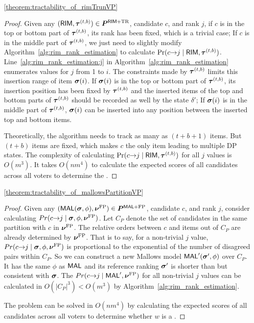 \begin{reptheorem} {\ref{theorem:tractability_of_rimTrunVP}}
  \theoremTractabilityOfRimTrun
\end{reptheorem}

\begin{proof}
    Given any $(\mathsf{RIM}, \bm{\tau}^{(t, b)}) \in \bm{P}^{\mathsf{RIM} \text{+TR}}$, candidate $c$, and rank $j$, if $c$ is in the top or bottom part of $\bm{\tau}^{(t, b)}$, its rank has been fixed, which is a trivial case;
    If $c$ is in the middle part of $\bm{\tau}^{(t, b)}$, we just need to slightly modify Algorithm~\ref{alg:rim_rank_estimation} to calculate $\Pr(c {\rightarrow} j \mid \mathsf{RIM}, \bm{\tau}^{(t, b)})$.
    Line~\ref{alg:rim_rank_estimation:j} in Algorithm~\ref{alg:rim_rank_estimation} enumerates values for $j$ from 1 to $i$.
    The constraints made by $\bm{\tau}^{(t, b)}$ limits this insertion range of item $\bm{\sigma}(i)$.
    If $\bm{\sigma}(i)$ is in the top or bottom part of $\bm{\tau}^{(t, b)}$, its insertion position has been fixed by $\bm{\tau}^{(t, b)}$ and the inserted items of the top and bottom parts of $\bm{\tau}^{(t, b)}$ should be recorded as well by the state $\delta'$;
    If $\bm{\sigma}(i)$ is in the middle part of $\bm{\tau}^{(t, b)}$, $\bm{\sigma}(i)$ can be inserted into any position between the inserted top and bottom items.

    Theoretically, the algorithm needs to track as many as $(t+b+1)$ items.
    But $(t+b)$ items are fixed, which makes $c$ the only item leading to multiple DP states.
    The complexity of calculating $\Pr(c {\rightarrow} j \mid \mathsf{RIM}, \bm{\tau}^{(t, b)})$ for all $j$ values is $O(m^3)$.
    It takes $O(nm^4)$ to calculate the expected scores of all candidates across all voters to determine the \mew.
\end{proof}

\begin{reptheorem}{\ref{theorem:tractability_of_mallowsPartitionVP}}
  \theoremTractabilityOfMallowsFP
\end{reptheorem}

\begin{proof}
    Given any $(\mathsf{MAL}(\bm{\sigma}, \phi), \bm{\nu}^{\text{FP}}) \in \bm{P}^{\mathsf{MAL} \text{+FP}}$, candidate $c$, and rank $j$, consider calculating $Pr(c {\rightarrow} j \mid \bm{\sigma}, \phi, \bm{\nu}^{\text{FP}})$.
    Let $C_P$ denote the set of candidates in the same partition with $c$ in $\bm{\nu}^{\text{FP}}$.
    The relative orders between $c$ and items out of $C_P$ are already determined by $\bm{\nu}^{\text{FP}}$.
    That is to say, for a non-trivial $j$ value, $Pr(c {\rightarrow} j \mid \bm{\sigma}, \phi, \bm{\nu}^{\text{FP}})$ is proportional to the exponential of the number of disagreed pairs within $C_P$.
    So we can construct a new Mallows model $\mathsf{MAL}'(\bm{\sigma}', \phi)$ over $C_P$.
    It has the same $\phi$ as $\mathsf{MAL}$ and its reference ranking $\bm{\sigma}'$ is shorter than but consistent with $\bm{\sigma}$.
    The $Pr(c {\rightarrow} j \mid \mathsf{MAL}', \bm{\nu}^{\text{FP}})$ for all non-trivial $j$ values can be calculated in $O(|C_P|^3) < O(m^3)$ by Algorithm~\ref{alg:rim_rank_estimation}.

    The \mew problem can be solved in $O(nm^4)$ by calculating the expected scores of all candidates across all voters to determine whether $w$ is a \mew.
\end{proof}

